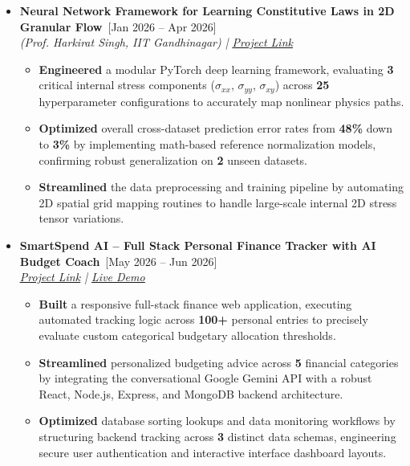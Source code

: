 \documentclass[a4paper,10pt]{article}
\newcommand{\isep}{-4 pt}
\newcommand{\resheading}[1]{{\small \colorbox{mygrey}{\begin{minipage}{0.965\textwidth}{\textbf{#1 \vphantom{p\^{E}}}}\end{minipage}}}}
\begin{document}
\vspace{0.15cm}
\indent\resheading{\textbf{PROJECTS}}
\vspace{-0.35cm}
\begin{itemize} \itemsep \isep
    
    \item \textbf{Neural Network Framework for Learning Constitutive Laws in 2D Granular Flow}\ \hfill [Jan 2026 -- Apr 2026] \\
 \emph{(Prof. Harkirat Singh, IIT Gandhinagar) 
 | \underline{\href{https://github.com/TagalpallewarAbhishek/Neural-Network-Framework-for-Learning-Constitutive-Laws-in-2D-Granular-Flow}{Project Link}}}
 \\[-0.7cm]
 
    \begin{itemize} \itemsep \isep
        \item \textbf{Engineered} a modular PyTorch deep learning framework, evaluating \textbf{3} critical internal stress components ($\sigma_{xx}$, $\sigma_{yy}$, $\sigma_{xy}$) across \textbf{25} hyperparameter configurations to accurately map nonlinear physics paths.
        \item \textbf{Optimized} overall cross-dataset prediction error rates from \textbf{48\%} down to \textbf{3\%} by implementing math-based reference normalization models, confirming robust generalization on \textbf{2} unseen datasets.
        \item \textbf{Streamlined} the data preprocessing and training pipeline by automating 2D spatial grid mapping routines to handle large-scale internal 2D stress tensor variations.
    \end{itemize}

    \item \textbf{SmartSpend AI -- Full Stack Personal Finance Tracker with AI Budget Coach}\ \hfill [May 2026 -- Jun 2026] \\
 \emph{\underline{\href{https://github.com/TagalpallewarAbhishek/SmartSpend-AI}{Project Link}}
 | \underline{\href{https://smart-spend-ai-nine.vercel.app}{Live Demo}}}
 \\[-0.7cm]
 
    \begin{itemize} \itemsep \isep
        \item \textbf{Built} a responsive full-stack finance web application, executing automated tracking logic across \textbf{100+} personal entries to precisely evaluate custom categorical budgetary allocation thresholds.
        \item \textbf{Streamlined} personalized budgeting advice across \textbf{5} financial categories by integrating the conversational Google Gemini API with a robust React, Node.js, Express, and MongoDB backend architecture.
        \item \textbf{Optimized} database sorting lookups and data monitoring workflows by structuring backend tracking across \textbf{3} distinct data schemas, engineering secure user authentication and interactive interface dashboard layouts.
    \end{itemize}


\end{itemize}
\end{document}
